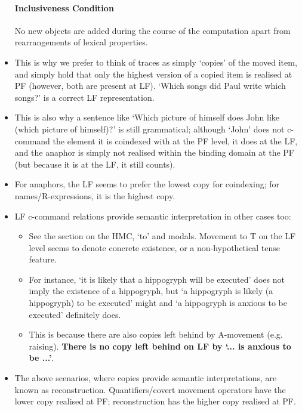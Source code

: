 \documentclass{article}
\begin{document}
\begin{itemize}
    \paragraph{Inclusiveness Condition} No new objects are added during the course of the computation apart from rearrangements of lexical properties.
    \item This is why we prefer to think of traces as simply `copies' of the moved item, and simply hold that only the highest version of a copied item is realised at PF (however, both are present at LF). `Which songs did Paul write which songs?' is a correct LF representation.
    \item This is also why a sentence like `Which picture of himself does John like (which picture of himself)?' is still grammatical; although `John' does not c-command the element it is coindexed with at the PF level, it does at the LF, and the anaphor is simply not realised within the binding domain at the PF (but because it is at the LF, it still counts).
    \item For anaphors, the LF seems to prefer the lowest copy for coindexing; for names/R-expressions, it is the highest copy.
    \item LF c-command relations provide semantic interpretation in other cases too:
    \begin{itemize}
        \item See the section on the HMC, `to' and modals. Movement to T on the LF level seems to denote concrete existence, or a non-hypothetical tense feature.
        \item For instance, `it is likely that a hippogryph will be executed' does not imply the existence of a hippogryph, but `a hippogryph is likely (a hippogryph) to be executed' might and `a hippogryph is anxious to be executed' definitely does.
        \item This is because there are also copies left behind by A-movement (e.g. raising). \textbf{There is no copy left behind on LF by `... is anxious to be ...'}.
    \end{itemize}
    \item The above scenarios, where copies provide semantic interpretations, are known as reconstruction. Quantifiers/covert movement operators have the lower copy realised at PF; reconstruction has the higher copy realised at PF.
\end{itemize}
\end{document}
